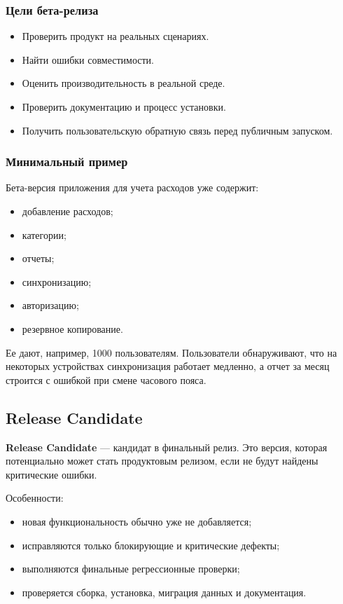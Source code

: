 \documentclass[12pt,a4paper]{article}
\begin{document}
\subsubsection{Цели бета-релиза}

\begin{itemize}
    \item Проверить продукт на реальных сценариях.
    \item Найти ошибки совместимости.
    \item Оценить производительность в реальной среде.
    \item Проверить документацию и процесс установки.
    \item Получить пользовательскую обратную связь перед публичным запуском.
\end{itemize}

\subsubsection{Минимальный пример}

Бета-версия приложения для учета расходов уже содержит:
\begin{itemize}
    \item добавление расходов;
    \item категории;
    \item отчеты;
    \item синхронизацию;
    \item авторизацию;
    \item резервное копирование.
\end{itemize}

Ее дают, например, 1000 пользователям. Пользователи обнаруживают, что на некоторых устройствах синхронизация работает медленно, а отчет за месяц строится с ошибкой при смене часового пояса.

\subsection{Release Candidate}

\textbf{Release Candidate} --- кандидат в финальный релиз. Это версия, которая потенциально может стать продуктовым релизом, если не будут найдены критические ошибки.

Особенности:
\begin{itemize}
    \item новая функциональность обычно уже не добавляется;
    \item исправляются только блокирующие и критические дефекты;
    \item выполняются финальные регрессионные проверки;
    \item проверяется сборка, установка, миграция данных и документация.
\end{itemize}
\end{document}
